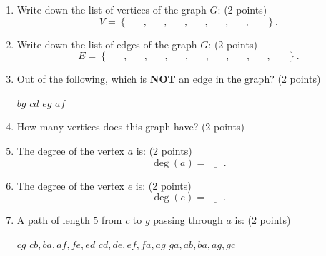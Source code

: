 \documentclass[12pt]{exam}
\begin{document}
\begin{enumerate}
\begin{figure}[h!]
\begin{tikzpicture}[x=0.75pt,y=0.75pt,yscale=-1,xscale=1]
    
    \end{tikzpicture}
    

    
\end{figure}

\begin{enumerate}
    \item \label{firstQnSec1} Write down the list of vertices of the graph $G$: (2 points)
    \vspace{0.5em}
    $$V=\left\lbrace\underline{\phantom{ans}},\underline{\phantom{ans}},\underline{\phantom{ans}},\underline{\phantom{ans}},\underline{\phantom{ans}},\underline{\phantom{ans}},\underline{\phantom{ans}}\right\rbrace.$$
    \vfill
    \item Write down the list of edges of the graph $G$: (2 points)
    \vspace{0.5em}
    $$E=\left\lbrace\underline{\phantom{ans}},\underline{\phantom{ans}},\underline{\phantom{ans}},\underline{\phantom{ans}},\underline{\phantom{ans}},\underline{\phantom{ans}},\underline{\phantom{ans}},\underline{\phantom{ans}},\underline{\phantom{ans}}\right\rbrace.$$
    \vfill
    \item Out of the following, which is \textbf{NOT} an edge in the graph? (2 points)
    \begin{checkboxes}
        \choice $bg$
        \choice $cd$
        \choice $eg$
        \choice $af$
    \end{checkboxes}
    \vfill
    \item How many vertices does this graph have? (2 points)
    \begin{checkboxes}
    \end{checkboxes}
    \vfill
    \newpage
    \item The degree of the vertex $a$ is: (2 points)
    \vspace{0.5em}
    $$\deg(a)=\underline{\phantom{ans}}.$$
    \vfill
    \item The degree of the vertex $e$ is: (2 points)
    \vspace{0.5em}
    $$\deg(e)=\underline{\phantom{ans}}.$$
    \vfill
    \item A path of length $5$ from $c$ to $g$ passing through $a$ is: (2 points)
    \begin{checkboxes}
        \choice $cg$
        \choice $cb,ba,af,fe,ed$
        \choice $cd,de,ef,fa,ag$
        \choice $ga,ab,ba,ag,gc$
    \end{checkboxes}

\end{enumerate}
\end{enumerate}
\end{document}
